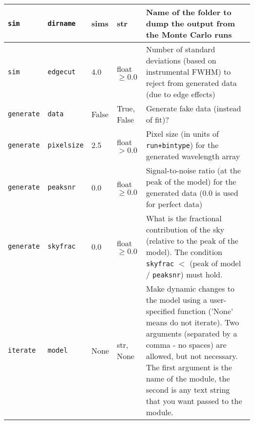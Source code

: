 \begin{center}
\begin{longtable}{p{1.5cm}p{2.5cm}p{2.0cm}p{2.0cm}p{5.0cm}}
\multicolumn{1}{p{1.5cm}}{\texttt{sim}} &
\multicolumn{1}{p{2.5cm}}{\texttt{dirname}} &
\multicolumn{1}{p{2.0cm}}{sims} &
\multicolumn{1}{p{2.0cm}}{str} &
\multicolumn{1}{p{5.0cm}}{Name of the folder to dump the output from the Monte Carlo runs} \\ \midrule

\multicolumn{1}{p{1.5cm}}{\texttt{sim}} &
\multicolumn{1}{p{2.5cm}}{\texttt{edgecut}} &
\multicolumn{1}{p{2.0cm}}{4.0} &
\multicolumn{1}{p{2.0cm}}{float $\ge0.0$} &
\multicolumn{1}{p{5.0cm}}{Number of standard deviations (based on instrumental FWHM) to reject from generated data (due to edge effects)} \\ \midrule

\multicolumn{1}{p{1.5cm}}{\texttt{generate}} &
\multicolumn{1}{p{2.5cm}}{\texttt{data}} &
\multicolumn{1}{p{2.0cm}}{False} &
\multicolumn{1}{p{2.0cm}}{True, False} &
\multicolumn{1}{p{5.0cm}}{Generate fake data (instead of fit)?} \\ \midrule

\multicolumn{1}{p{1.5cm}}{\texttt{generate}} &
\multicolumn{1}{p{2.5cm}}{\texttt{pixelsize}} &
\multicolumn{1}{p{2.0cm}}{2.5} &
\multicolumn{1}{p{2.0cm}}{float $>0.0$} &
\multicolumn{1}{p{5.0cm}}{Pixel size (in units of \texttt{run+bintype}) for the generated wavelength array} \\ \midrule

\multicolumn{1}{p{1.5cm}}{\texttt{generate}} &
\multicolumn{1}{p{2.5cm}}{\texttt{peaksnr}} &
\multicolumn{1}{p{2.0cm}}{0.0} &
\multicolumn{1}{p{2.0cm}}{float $\ge0.0$} &
\multicolumn{1}{p{5.0cm}}{Signal-to-noise ratio (at the peak of the model) for the generated data (0.0 is used for perfect data)} \\ \midrule

\multicolumn{1}{p{1.5cm}}{\texttt{generate}} &
\multicolumn{1}{p{2.5cm}}{\texttt{skyfrac}} &
\multicolumn{1}{p{2.0cm}}{0.0} &
\multicolumn{1}{p{2.0cm}}{float $\ge0.0$} &
\multicolumn{1}{p{5.0cm}}{What is the fractional contribution of the sky (relative to the peak of the model). The condition \texttt{skyfrac} $<$ (peak of model / \texttt{peaksnr}) must hold.} \\ \midrule

\multicolumn{1}{p{1.5cm}}{\texttt{iterate}} &
\multicolumn{1}{p{2.5cm}}{\texttt{model}} &
\multicolumn{1}{p{2.0cm}}{None} &
\multicolumn{1}{p{2.0cm}}{str, None} &
\multicolumn{1}{p{5.0cm}}{Make dynamic changes to the model using a user-specified function ('None' means do not iterate). Two arguments (separated by a comma - no spaces) are allowed, but not necessary. The first argument is the name of the module, the second is any text string that you want passed to the module.} \\ \midrule


\end{longtable}
\end{center}
